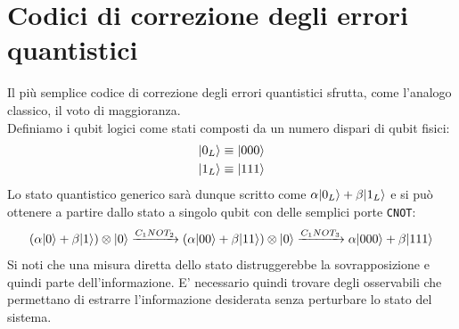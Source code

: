 \documentclass[12pt, a4paper]{report}
\begin{document}
\section{Codici di correzione degli errori quantistici}
Il più semplice codice di correzione degli errori quantistici sfrutta, come l'analogo classico, il voto di maggioranza.\\
Definiamo i qubit logici come stati composti da un numero dispari di qubit fisici:
\begin{equation*}
    \begin{split}
        | 0_{L} \rangle &\equiv | 000 \rangle \\
        | 1_{L} \rangle &\equiv | 111 \rangle
    \end{split}
\end{equation*}
Lo stato quantistico generico sarà dunque scritto come $\alpha| 0_{L} \rangle+\beta| 1_{L} \rangle$ e si può ottenere a partire dallo stato a singolo qubit con delle semplici porte \texttt{CNOT}:
\begin{equation*}
    (\alpha| 0 \rangle+\beta| 1 \rangle)\otimes| 0 \rangle\xrightarrow{C_{1}NOT_{2}}(\alpha| 00 \rangle+\beta| 11 \rangle)\otimes| 0 \rangle\xrightarrow{C_{1}NOT_{3}}\alpha| 000 \rangle+\beta| 111 \rangle
\end{equation*}
Si noti che una misura diretta dello stato distruggerebbe la sovrapposizione e quindi parte dell'informazione. E' necessario quindi trovare degli osservabili che permettano di estrarre l'informazione desiderata senza perturbare  lo stato del sistema.
\end{document}
